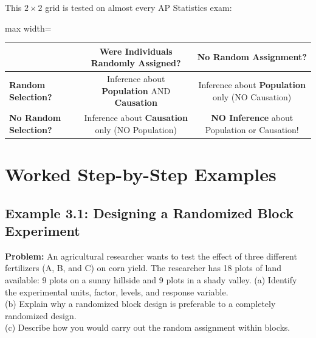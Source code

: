 \begin{lessonbox}
This $2 \times 2$ grid is tested on almost every AP Statistics exam:
\begin{center}
\begin{adjustbox}{max width=\linewidth}
\begin{tabular}{|l|c|c|}
\hline
& \textbf{Were Individuals Randomly Assigned?} & \textbf{No Random Assignment?} \\
\hline
\textbf{Random Selection?} & Inference about \textbf{Population} AND \textbf{Causation} & Inference about \textbf{Population} only (NO Causation) \\
\hline
\textbf{No Random Selection?} & Inference about \textbf{Causation} only (NO Population) & \textbf{NO Inference} about Population or Causation! \\
\hline
\end{tabular}
\end{adjustbox}
\end{center}
\end{lessonbox}

\section{Worked Step-by-Step Examples}

\subsection*{Example 3.1: Designing a Randomized Block Experiment}
\textbf{Problem:} An agricultural researcher wants to test the effect of three different fertilizers (A, B, and C) on corn yield. The researcher has 18 plots of land available: 9 plots on a sunny hillside and 9 plots in a shady valley.
(a) Identify the experimental units, factor, levels, and response variable.\\
(b) Explain why a randomized block design is preferable to a completely randomized design.\\
(c) Describe how you would carry out the random assignment within blocks.

